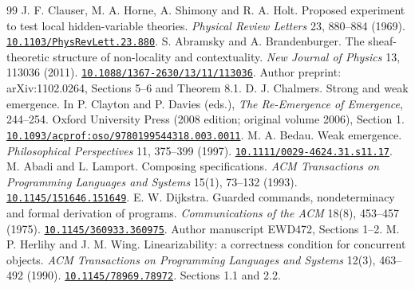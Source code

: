 \documentclass[11pt]{article}
\newcommand{\doi}[1]{\href{https://doi.org/#1}{\nolinkurl{#1}}}
\begin{document}
\begin{thebibliography}{99}
 J. F. Clauser, M. A. Horne, A. Shimony and R. A. Holt. Proposed experiment to test local hidden-variable theories. \emph{Physical Review Letters} 23, 880--884 (1969). \doi{10.1103/PhysRevLett.23.880}.
 S. Abramsky and A. Brandenburger. The sheaf-theoretic structure of non-locality and contextuality. \emph{New Journal of Physics} 13, 113036 (2011). \doi{10.1088/1367-2630/13/11/113036}. Author preprint: arXiv:1102.0264, Sections 5--6 and Theorem 8.1.
 D. J. Chalmers. Strong and weak emergence. In P. Clayton and P. Davies (eds.), \emph{The Re-Emergence of Emergence}, 244--254. Oxford University Press (2008 edition; original volume 2006), Section 1. \doi{10.1093/acprof:oso/9780199544318.003.0011}.
 M. A. Bedau. Weak emergence. \emph{Philosophical Perspectives} 11, 375--399 (1997). \doi{10.1111/0029-4624.31.s11.17}.
 M. Abadi and L. Lamport. Composing specifications. \emph{ACM Transactions on Programming Languages and Systems} 15(1), 73--132 (1993). \doi{10.1145/151646.151649}.
 E. W. Dijkstra. Guarded commands, nondeterminacy and formal derivation of programs. \emph{Communications of the ACM} 18(8), 453--457 (1975). \doi{10.1145/360933.360975}. Author manuscript EWD472, Sections 1--2.
 M. P. Herlihy and J. M. Wing. Linearizability: a correctness condition for concurrent objects. \emph{ACM Transactions on Programming Languages and Systems} 12(3), 463--492 (1990). \doi{10.1145/78969.78972}. Sections 1.1 and 2.2.
\end{thebibliography}
\end{document}
